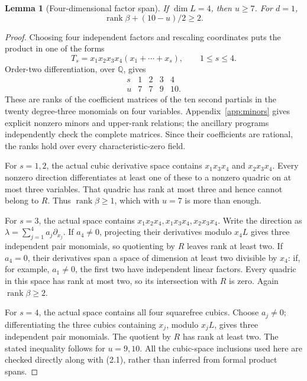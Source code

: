 \documentclass[11pt]{amsart}
\newtheorem{lemma}[theorem]{Lemma}
\theoremstyle{definition}
\numberwithin{equation}{section}
\newcommand{\Q}{\mathbb Q}
\newcommand{\rank}{\operatorname{rank}}
\begin{document}
\begin{lemma}[Four-dimensional factor span]\label{lem:four}
If \(\dim L=4\), then \(u\ge7\). For \(d=1\),
\[
 \rank\beta+(10-u)/2\ge2.
\]
\end{lemma}
\begin{proof}
Choosing four independent factors and rescaling coordinates puts the product
in one of the forms
\[
 T_s=x_1x_2x_3x_4(x_1+\cdots+x_s),\qquad 1\le s\le4.
\]
Order-two differentiation, over \(\Q\), gives
\[
\begin{array}{c|rrrr}
s&1&2&3&4\\\hline
u&7&7&9&10.
\end{array}                                                    \tag{2.1}
\]
These are ranks of the coefficient matrices of the ten second partials
in the twenty degree-three monomials on four variables. Appendix~\ref{app:minors}
gives explicit nonzero minors and upper-rank relations; the ancillary
programs independently check the complete matrices. Since their coefficients are rational, the ranks
hold over every characteristic-zero field.

For \(s=1,2\), the actual cubic derivative space contains
\(x_1x_3x_4\) and \(x_2x_3x_4\). Every nonzero direction differentiates
at least one of these to a nonzero quadric on at most three variables.
That quadric has rank at most three and hence cannot belong to \(R\).
Thus \(\rank\beta\ge1\), which with \(u=7\) is more than enough.

For \(s=3\), the actual space contains
\(x_1x_2x_4,x_1x_3x_4,x_2x_3x_4\). Write the direction as
\(\lambda=\sum_{j=1}^4a_j\partial_{x_j}\). If \(a_4\ne0\), projecting
their derivatives modulo \(x_4L\) gives three independent pair monomials,
so quotienting by \(R\) leaves rank at least two. If \(a_4=0\), their
derivatives span a space of dimension at least two divisible by \(x_4\):
if, for example, \(a_1\ne0\), the first two have independent linear
factors. Every quadric in this space has rank at most two, so its intersection
with \(R\) is zero. Again \(\rank\beta\ge2\).

For \(s=4\), the actual space contains all four squarefree cubics. Choose
\(a_j\ne0\); differentiating the three cubics containing \(x_j\), modulo
\(x_jL\), gives three independent pair monomials. The quotient by \(R\)
has rank at least two. The stated inequality follows for \(u=9,10\).
All the cubic-space inclusions used here are checked directly along with
(2.1), rather than inferred from formal product spans.
\end{proof}
\end{document}
